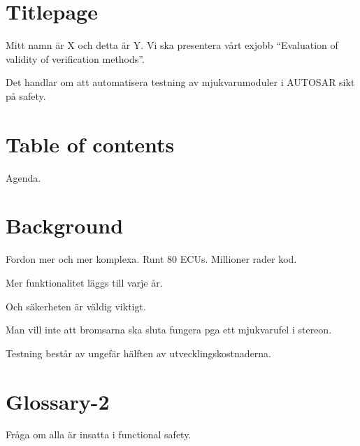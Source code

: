 \documentclass[a4paper]{article}
\begin{document}
\section{Titlepage}
Mitt namn är X och detta är Y. Vi ska presentera vårt exjobb
``Evaluation of validity of verification methods''.

Det handlar om att automatisera testning av mjukvarumoduler i AUTOSAR sikt
på safety.

\section{Table of contents}
Agenda.

\section{Background}
Fordon mer och mer komplexa. Runt 80 ECUs. Millioner rader kod.


Mer funktionalitet läggs till varje år.

Och säkerheten är väldig viktigt.

Man vill inte att bromsarna ska sluta fungera pga ett mjukvarufel i stereon.

Testning består av ungefär hälften av utvecklingskostnaderna.

\section{Glossary-2}
Fråga om alla är insatta i functional safety.
\end{document}
